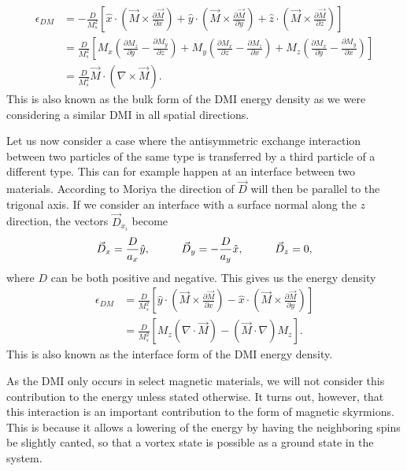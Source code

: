 \documentclass[12pt, a4paper, twoside, openright]{article}		%
\numberwithin{equation}{section}
\begin{document}
\begin{align}
\nonumber \epsilon_{DM} &= -\frac{D}{M_s^2} \left[ \hat{x}\cdot(\vec{M}\times\frac{\partial\vec{M}}{\partial x}) + \hat{y}\cdot(\vec{M}\times\frac{\partial\vec{M}}{\partial y}) + \hat{z}\cdot (\vec{M}\times\frac{\partial\vec{M}}{\partial z})\right] \\
\nonumber &= \frac{D}{M_s^2}\left[M_x(\frac{\partial M_z}{\partial y} - \frac{\partial M_y}{\partial z}) + M_y(\frac{\partial M_x}{\partial z} - \frac{\partial M_z}{\partial x}) + M_z(\frac{\partial M_x}{\partial y} - \frac{\partial M_y}{\partial x})\right] \\
&= \frac{D}{M_s^2} \vec{M}\cdot(\nabla\times\vec{M}). \label{eq:BulkDMI}
\end{align}
This is also known as the bulk form of the DMI energy density as we were considering a similar DMI in all spatial directions.

Let us now consider a case where the antisymmetric exchange interaction between two particles of the same type is transferred by a third particle of a different type. This can for example happen at an interface between two materials. According to Moriya the direction of $\vec{D}$ will then be parallel to the trigonal axis. If we consider an interface with a surface normal along the $z$ direction, the vectors $\vec{D}_{x_i}$ become
\begin{align}
\vec{D}_x = \frac{D}{a_x} \hat{y}, \hspace{10mm}
\vec{D}_y = - \frac{D}{a_y} \hat{x}, \hspace{10mm}
\vec{D}_z = 0,
\end{align}
where $D$ can be both positive and negative. This gives us the energy density
\begin{align}
\label{eq:InterfaceDMIe}
\epsilon_{DM} &= \frac{D}{M_s^2}\left[ \hat{y} \cdot(\vec{M}\times\frac{\partial\vec{M}}{\partial x}) - \hat{x} \cdot(\vec{M}\times\frac{\partial\vec{M}}{\partial y})\right] \\
&= \frac{D}{M_s^2}\left[ M_z (\nabla\cdot\vec{M}) - (\vec{M}\cdot\nabla)M_z\right]. \label{eq:IntDMI}
\end{align}
This is also known as the interface form of the DMI energy density.

As the DMI only occurs in select magnetic materials, we will not consider this contribution to the energy unless stated otherwise. It turns out, however, that this interaction is an important contribution to the form of magnetic skyrmions. This is because it allows a lowering of the energy by having the neighboring spins be slightly canted, so that a vortex state is possible as a ground state in the system.
\end{document}
